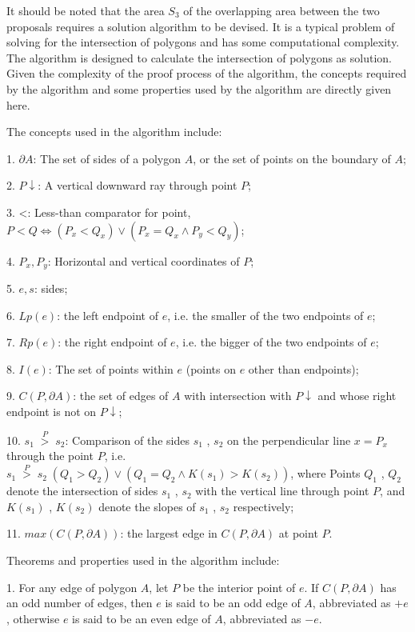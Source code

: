 It should be noted that the area $S_3$ of the overlapping area between the two proposals requires a solution algorithm to be devised. It is a typical problem of solving for the intersection of polygons and has some computational complexity. The algorithm is designed to calculate the intersection of polygons as solution. Given the complexity of the proof process of the algorithm\cite{bib10}, the concepts required by the algorithm and some properties used by the algorithm are directly given here.

The concepts used in the algorithm include:

1. $\partial A$: The set of sides of a polygon $A$, or the set of points on the boundary of $A$;

2. $P\downarrow$: A vertical downward ray through point $P$;

3. <: Less-than comparator for point, $P < Q \Leftrightarrow (P_x < Q_x )\vee (P_x =Q_x \wedge  P_y < Q_y)$;

4. $P_{x},P_{y}$: Horizontal and vertical coordinates of $P$;

5. $e, s$: sides;

6. $Lp(e)$: the left endpoint of $e$, i.e. the smaller of the two endpoints of $e$;

7. $Rp(e)$: the right endpoint of $e$, i.e. the bigger of the two endpoints of $e$;

8. $I(e)$: The set of points within $e$ (points on $e$ other than endpoints);

9. $C(P , \partial A) $: the set of edges of $A$ with intersection with $P\downarrow$ and whose right endpoint is not on $P\downarrow$;

10. $s_{1}\;\mathop  > \limits^P  \;s_{2}$: Comparison of the sides $s_{1}$ , $s_{2}$ on the perpendicular line $x = P_x$ through the point $P$, i.e. $s_{1} \; \mathop  > \limits^P \; s_{2} \; (Q_1 >Q_2)\vee  (Q_{1}  =Q_{2}  \wedge K(s_{1})  >K(s_{2}) )$, where Points $Q_{1}$ , $Q_{2}$ denote the intersection of sides $s_{1}$ , $s_{2}$ with the vertical line through point $P$, and $K(s_{1})$ , $K(s_{2})$ denote the slopes of $s_{1}$ , $s_{2}$ respectively;  

11. $max(C(P , \partial A))$: the largest edge in $C(P , \partial A)$ at point $P$.

Theorems and properties used in the algorithm include:

1. For any edge of polygon $A$, let $P$ be the interior point of $e$. If $C(P , \partial A)$ has an odd number of edges, then $e$ is said to be an odd edge of $A$, abbreviated as $+e$, otherwise $e$ is said to be an even edge of $A$, abbreviated as $-e$.

